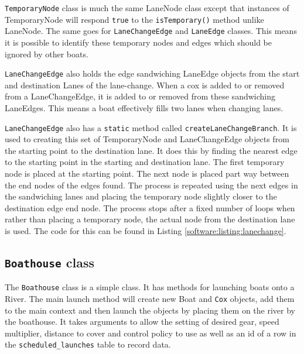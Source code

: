 \texttt{TemporaryNode} class is much the same LaneNode class except that
instances of TemporaryNode will respond \texttt{true} to the
\texttt{isTemporary()} method unlike
LaneNode. The same goes for \texttt{LaneChangeEdge} and \texttt{LaneEdge} classes. This
means it is possible to identify these temporary nodes and edges which
should be ignored by other boats.

\texttt{LaneChangeEdge} also holds the edge sandwiching LaneEdge objects from
the start and destination Lanes of the lane-change. When a cox is
added to or removed from a LaneChangeEdge, it is added to or removed
from these sandwiching LaneEdges. This means a boat effectively fills
two lanes when changing lanes.

\texttt{LaneChangeEdge} also has a \texttt{static} method called \texttt{createLaneChangeBranch}. It is used to creating this
set of TemporaryNode and LaneChangeEdge objects from the starting
point to the destination lane. It does this by finding the nearest
edge to the starting point in the starting and destination lane. The
first temporary node is placed at the starting point. The next node is
placed part way between the end nodes of the edges found. The process
is repeated using the next edges in the sandwiching lanes and placing
the temporary node slightly closer to the destination edge end
node. The process stops after a fixed number of loops when rather than
placing a temporary node, the actual node from the destination lane is
used. The code for this can be found in Listing \ref{software:listing:lanechange}.



\subsection{\texttt{Boathouse} class}
The \texttt{Boathouse} class is a simple class. It has methods for launching
boats onto a River. The main launch method will create new Boat and
\texttt{Cox} objects, add them to the main context and then launch the objects
by placing them on the river by the boathouse. It takes arguments to
allow the setting of desired gear, speed multiplier, distance to
cover and control policy to use as well as an id of a row in the
\texttt{scheduled\_launches} table to record data.

